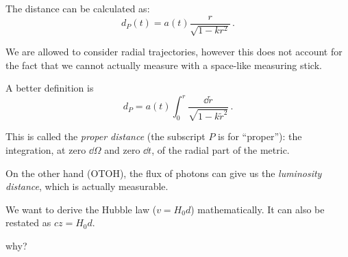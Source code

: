 \documentclass[main.tex]{subfiles}
\begin{document}







The distance can be calculated as:
%
\begin{equation}
  d_P (t) = a(t)\frac{r}{\sqrt{1-kr^2}}\,.
\end{equation}

We are allowed to consider radial trajectories, however this does not account for the fact that we cannot actually measure with a space-like measuring stick.

A better definition is
%
\begin{equation}
  d_P = a(t) \int_0^r \frac{\dd{\widetilde{r}}}{\sqrt{1-k \widetilde{r}^2}}\,.
\end{equation}

This is called the \emph{proper distance} (the subscript \(P\) is for ``proper''): the integration, at zero \(\dd{\Omega}\) and zero \(\dd{t}\), of the radial part of the metric.

On the other hand (OTOH), the flux of photons can give us the \emph{luminosity distance}, which is actually measurable.

We want to derive the Hubble law (\(v = H_0 d\)) mathematically. It can also be restated as \(cz = H_0 d\). 

\begin{greenbox}
  why?
\end{greenbox}
\end{document}
